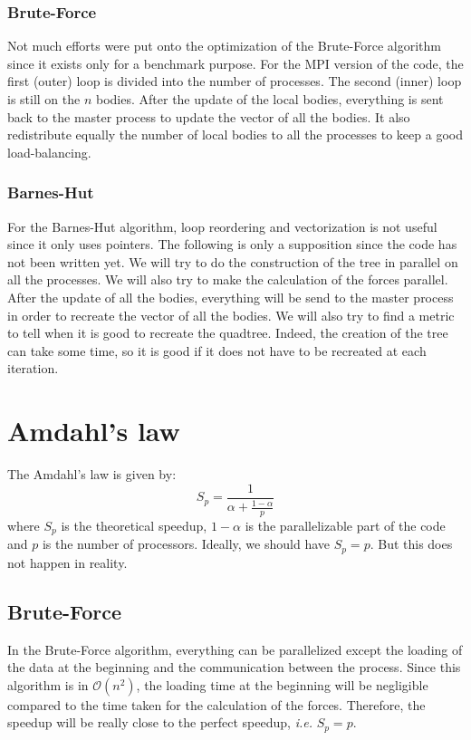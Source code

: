 \documentclass[11pt,a4paper]{article}
\begin{document}
\subsubsection{Brute-Force}

Not much efforts were put onto the optimization of the Brute-Force algorithm since it exists only for a benchmark purpose. For the MPI version of the code, the first (outer) loop is divided into the number of processes. The second (inner) loop is still on the $n$ bodies. After the update of the local bodies, everything is sent back to the master process to update the vector of all the bodies. It also redistribute equally the number of local bodies to all the processes to keep a good load-balancing.

\subsubsection{Barnes-Hut}

For the Barnes-Hut algorithm, loop reordering and vectorization is not useful since it only uses pointers. The following is only a supposition since the code has not been written yet. We will try to do the construction of the tree in parallel on all the processes. We will also try to make the calculation of the forces parallel. After the update of all the bodies, everything will be send to the master process in order to recreate the vector of all the bodies. We will also try to find a metric to tell when it is good to recreate the quadtree. Indeed, the creation of the tree can take some time, so it is good if it does not have to be recreated at each iteration.

\section{Amdahl's law}

The Amdahl's law is given by:
\begin{equation}
S_{p} = \frac{1}{\alpha + \frac{1-\alpha}{p}}
\end{equation}
where $S_{p}$ is the theoretical speedup, $1-\alpha$ is the parallelizable part of the code and $p$ is the number of processors. Ideally, we should have $S_p = p$. But this does not happen in reality.

\subsection{Brute-Force}

In the Brute-Force algorithm, everything can be parallelized except the loading of the data at the beginning and the communication between the process. Since this algorithm is in $\mathcal{O}(n^2)$, the loading time at the beginning will be negligible compared to the time taken for the calculation of the forces. Therefore, the speedup will be really close to the perfect speedup, {\it i.e.} $S_p = p$.
\end{document}
